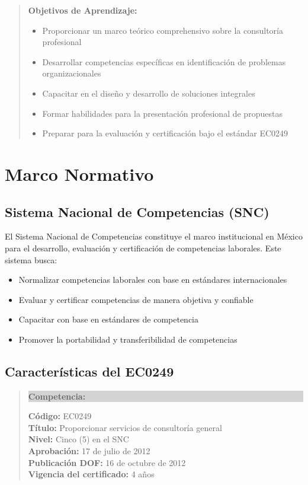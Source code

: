\documentclass[12pt,letterpaper,oneside]{book}
\newenvironment{objetivos}
{\begin{quote}\color{textgray}\textbf{Objetivos de Aprendizaje:}\begin{itemize}}
{\end{itemize}\end{quote}}
\newenvironment{competencia}
{\begin{quote}\colorbox{lightgray}{\parbox{\dimexpr\linewidth-2\fboxsep}{\textbf{Competencia:}\ }}}
{\end{quote}}
\begin{document}
\begin{objetivos}
\item Proporcionar un marco teórico comprehensivo sobre la consultoría profesional
\item Desarrollar competencias específicas en identificación de problemas organizacionales
\item Capacitar en el diseño y desarrollo de soluciones integrales
\item Formar habilidades para la presentación profesional de propuestas
\item Preparar para la evaluación y certificación bajo el estándar EC0249
\end{objetivos}

\section{Marco Normativo}

\subsection{Sistema Nacional de Competencias (SNC)}

El Sistema Nacional de Competencias constituye el marco institucional en México para el desarrollo, evaluación y certificación de competencias laborales. Este sistema busca:

\begin{itemize}
\item Normalizar competencias laborales con base en estándares internacionales
\item Evaluar y certificar competencias de manera objetiva y confiable
\item Capacitar con base en estándares de competencia
\item Promover la portabilidad y transferibilidad de competencias
\end{itemize}

\subsection{Características del EC0249}

\begin{competencia}
\textbf{Código:} EC0249\\
\textbf{Título:} Proporcionar servicios de consultoría general\\
\textbf{Nivel:} Cinco (5) en el SNC\\
\textbf{Aprobación:} 17 de julio de 2012\\
\textbf{Publicación DOF:} 16 de octubre de 2012\\
\textbf{Vigencia del certificado:} 4 años
\end{competencia}
\end{document}
